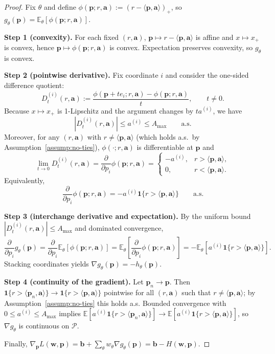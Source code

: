 \documentclass[11pt]{article}
\newcommand{\bb}{\mathbf{b}}
\newcommand{\ba}{\mathbf{a}}
\newcommand{\bp}{\mathbf{p}}
\newcommand{\bw}{\mathbf{w}}
\newcommand{\E}{\mathbb{E}}
\newcommand{\cP}{\mathcal{P}}
\begin{document}
\begin{proof}
Fix $\theta$ and define $\phi(\bp; r, \ba) := (r - \langle \bp, \ba \rangle)_+$, so $g_\theta(\bp) = \E_\theta[\phi(\bp; r, \ba)]$.

\textbf{Step 1 (convexity).}
For each fixed $(r, \ba)$, $\bp \mapsto r - \langle \bp, \ba \rangle$ is affine and $x \mapsto x_+$ is convex, hence $\bp \mapsto \phi(\bp; r, \ba)$ is convex. Expectation preserves convexity, so $g_\theta$ is convex.

\textbf{Step 2 (pointwise derivative).}
Fix coordinate $i$ and consider the one-sided difference quotient:
\[
D_t^{(i)}(r, \ba) := \frac{\phi(\bp + t e_i; r, \ba) - \phi(\bp; r, \ba)}{t}, \qquad t \neq 0.
\]
Because $x \mapsto x_+$ is 1-Lipschitz and the argument changes by $t a^{(i)}$, we have
\[
|D_t^{(i)}(r, \ba)| \le a^{(i)} \le A_{\max} \qquad \text{a.s.}
\]
Moreover, for any $(r, \ba)$ with $r \neq \langle \bp, \ba \rangle$ (which holds a.s.\ by Assumption~\ref{assump:no-ties}), $\phi(\cdot; r, \ba)$ is differentiable at $\bp$ and
\[
\lim_{t \to 0} D_t^{(i)}(r, \ba) = \frac{\partial}{\partial p_i} \phi(\bp; r, \ba) =
\begin{cases}
-a^{(i)}, & r > \langle \bp, \ba \rangle, \\
0, & r < \langle \bp, \ba \rangle.
\end{cases}
\]
Equivalently,
\[
\frac{\partial}{\partial p_i} \phi(\bp; r, \ba) = -a^{(i)} \mathbf{1}\{r > \langle \bp, \ba \rangle\} \qquad \text{a.s.}
\]

\textbf{Step 3 (interchange derivative and expectation).}
By the uniform bound $|D_t^{(i)}(r, \ba)| \le A_{\max}$ and dominated convergence,
\[
\frac{\partial}{\partial p_i} g_\theta(\bp) = \frac{\partial}{\partial p_i} \E_\theta[\phi(\bp; r, \ba)] = \E_\theta\!\left[\frac{\partial}{\partial p_i} \phi(\bp; r, \ba)\right] = -\E_\theta\!\left[a^{(i)} \mathbf{1}\{r > \langle \bp, \ba \rangle\}\right].
\]
Stacking coordinates yields $\nabla g_\theta(\bp) = -h_\theta(\bp)$.

\textbf{Step 4 (continuity of the gradient).}
Let $\bp_n \to \bp$. Then $\mathbf{1}\{r > \langle \bp_n, \ba \rangle\} \to \mathbf{1}\{r > \langle \bp, \ba \rangle\}$ pointwise for all $(r, \ba)$ such that $r \neq \langle \bp, \ba \rangle$; by Assumption~\ref{assump:no-ties} this holds a.s. Bounded convergence with $0 \le a^{(i)} \le A_{\max}$ implies $\E[a^{(i)} \mathbf{1}\{r > \langle \bp_n, \ba \rangle\}] \to \E[a^{(i)} \mathbf{1}\{r > \langle \bp, \ba \rangle\}]$, so $\nabla g_\theta$ is continuous on $\cP$.

Finally, $\nabla_\bp L(\bw, \bp) = \bb + \sum_\theta w_\theta \nabla g_\theta(\bp) = \bb - H(\bw, \bp)$.
\end{proof}
\end{document}
